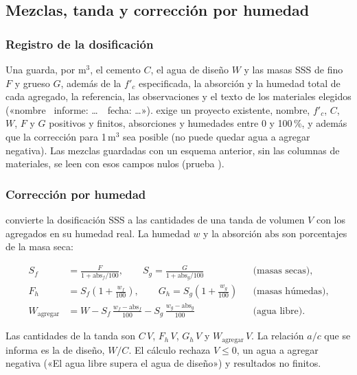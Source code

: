 \subsection{Mezclas, tanda y corrección por humedad}
\label{sec:con-mezclas}

\subsubsection{Registro de la dosificación}

Una  guarda, por m$^3$, el cemento $C$, el agua de diseño $W$ y las masas SSS de fino $F$ y grueso $G$,
además de la $f'_c$ especificada, la absorción y la humedad total de cada agregado, la referencia, las observaciones y
el texto de los materiales elegidos («nombre \textbar\ informe: \dots\ \textbar\ fecha: \dots»).
 exige un proyecto existente, nombre, $f'_c$, $C$, $W$, $F$ y $G$ positivos y
finitos, absorciones y humedades entre 0 y 100\,\%, y además que la corrección para 1\,m$^3$ sea posible (no puede
quedar agua a agregar negativa). Las mezclas guardadas con un esquema anterior, sin las columnas de materiales, se leen
con esos campos nulos (prueba ).

\subsubsection{Corrección por humedad}

 convierte la dosificación SSS a las cantidades de una tanda de
volumen $V$ con los agregados en su humedad real. La humedad $w$ y la absorción $\text{abs}$ son porcentajes de la masa
seca:

\begin{align}
	S_f &= \frac{F}{1 + \text{abs}_f/100}, \qquad S_g = \frac{G}{1 + \text{abs}_g/100} && \text{(masas secas)}, \\
	F_h &= S_f \left(1 + \frac{w_f}{100}\right), \qquad G_h = S_g \left(1 + \frac{w_g}{100}\right) && \text{(masas húmedas)}, \\
	W_{\text{agregar}} &= W - S_f\,\frac{w_f - \text{abs}_f}{100} - S_g\,\frac{w_g - \text{abs}_g}{100}
	&& \text{(agua libre)}.
\end{align}

Las cantidades de la tanda son $C\,V$, $F_h\,V$, $G_h\,V$ y $W_{\text{agregar}}\,V$. La relación $a/c$ que se informa es
la de diseño, $W/C$. El cálculo rechaza $V \le 0$, un agua a agregar negativa («El agua libre supera el agua de diseño»)
y resultados no finitos.

